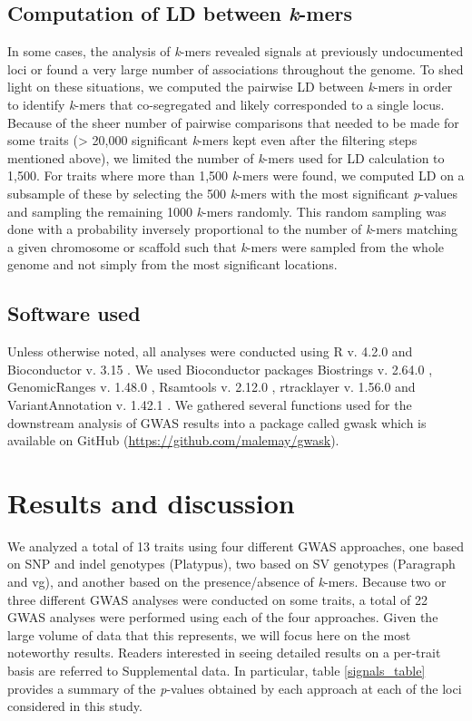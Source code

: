 \subsection*{Computation of LD between \emph{k}-mers}
\label{sv-gwas-ld-kmers}

In some cases, the analysis of \emph{k}-mers revealed signals at previously
undocumented loci or found a very large number of associations throughout the
genome. To shed light on these situations, we computed the pairwise LD between
\emph{k}-mers in order to identify \emph{k}-mers that co-segregated and
likely corresponded to a single locus. Because of the sheer number of pairwise
comparisons that needed to be made for some traits (> 20,000 significant
\emph{k}-mers kept even after the filtering steps mentioned above), we limited
the number of \emph{k}-mers used for LD calculation to 1,500. For traits where
more than 1,500 \emph{k}-mers were found, we computed LD on a subsample of
these by selecting the 500 \emph{k}-mers with the most significant
\emph{p}-values and sampling the remaining 1000 \emph{k}-mers randomly. This
random sampling was done with a probability inversely proportional to the
number of \emph{k}-mers matching a given chromosome or scaffold such that
\emph{k}-mers were sampled from the whole genome and not simply from the most
significant locations.

\subsection*{Software used}
\label{sv-gwas-software-used}

Unless otherwise noted, all analyses were conducted using R v. 4.2.0
\citep{r2022} and Bioconductor v. 3.15 \citep{huber2015}. We used Bioconductor
packages Biostrings v. 2.64.0 \citep{pages2022}, GenomicRanges v. 1.48.0
\citep{lawrence2013}, Rsamtools v. 2.12.0 \citep{rsamtools2022}, rtracklayer v.
1.56.0 \citep{lawrence2009} and VariantAnnotation v. 1.42.1
\citep{obenchain2014}.  We gathered several functions used for the downstream
analysis of GWAS results into a package called gwask which is available on
GitHub (\url{https://github.com/malemay/gwask}).

\section*{Results and discussion}
\label{sv-gwas-results-discussion}

We analyzed a total of 13 traits using four different GWAS approaches, one
based on SNP and indel genotypes (Platypus), two based on SV genotypes (Paragraph and
vg), and another based on the presence/absence of \textit{k}-mers.
Because two or three different GWAS analyses were conducted on some traits, a
total of 22 GWAS analyses were performed using each of the four approaches.
Given the large volume of data that this represents, we will focus here on the
most noteworthy results. Readers interested in seeing detailed results on a
per-trait basis are referred to
Supplemental data. In particular, table \ref{signals_table}
provides a summary of the \textit{p}-values obtained by each approach at each
of the loci considered in this study.

